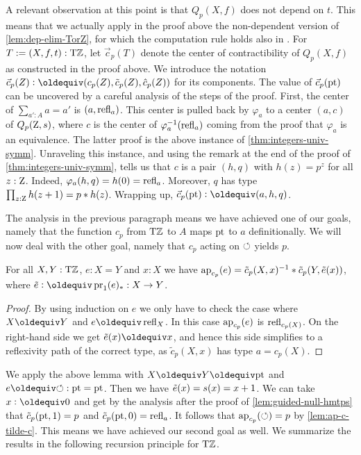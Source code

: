 \documentclass[a4paper,12pt]{amsart}
\begin{document}
A relevant observation at this point is that $Q_p(X,f)$ does not depend on $t$.
This means that we actually apply in the proof above the non-dependent version
of \cref{lem:dep-elim-TorZ}, for which the computation rule holds also in {\UniMath}.
For $T := (X,f,t) : {\mathrm{T}\mathbb{Z}}$, let $\vec{c}_p(T)$ denote the center of contractibility
of $Q_p(X,f)$ as constructed in the proof above.
  We introduce the notation $\vec{c}_p(Z)\defeq(c_p(Z),\tilde{c}_p(Z),\hat{c}_p(Z))$ for its components.
  The value of $\vec{c}_p({\mathord{\mathrm{pt}}})$ can be uncovered by a careful analysis of the steps of the proof.
First, the center of $\sum_{a':A} a=a'$ is $(a,\mathop{{\mathrm{refl}}_{a}})$.
This center is pulled back by $\varphi_{a}$ to a center
$(a,c)$ of $Q_p(\mathrm{Z},s)$, where $c$ is the center of
$\varphi_{a}^{-1}(\mathop{{\mathrm{refl}}_{a}})$ coming from the proof
that $\varphi_{a}$ is an equivalence. The latter proof
is the above instance of \cref{thm:integers-univ-symm}.
Unraveling this instance, and using the remark at the
end of the proof of \cref{thm:integers-univ-symm},
tells us that $c$ is a pair $(h,q)$ with $h(z)=p^z$
for all $z:\mathrm{Z}$. Indeed, $\varphi_{a}(h,q) = h(0) = \mathop{{\mathrm{refl}}_{a}}$.
Moreover, $q$ has type $\prod_{z:\mathrm{Z}} h(z+1)=p* h(z)$.
Wrapping up, $\vec c_p(\pt)\defeq (a,h,q)$.

The analysis in the previous paragraph
means we have achieved one of our goals,
namely that the function $c_p$ from ${\mathrm{T}\mathbb{Z}}$ to $A$
maps ${\mathord{\mathrm{pt}}}$ to $a$ definitionally.
We will now deal with the other goal,
namely that $c_p$ acting on ${\circlearrowleft}$ yields $p$.

\begin{lemma}\label{lem:ap-c-tilde-c}
For all $X,Y:{\mathrm{T}\mathbb{Z}}$, $e: X=Y$ and $x:X$ we have
$\mathop{{\mathrm{ap}}_{c_p}}(e) = \tilde c_p(X,x)^{-1}* \tilde c_p(Y,\tilde {e}(x))$,
where $\ptoe{e}\defeq \pr_1(e)_* : X\to Y$.
\end{lemma}
\begin{proof}
By using induction on $e$ we only have to check the case where
$X\jdeq Y$ and $e\jdeq\refl{X}$. In this case $\mathop{{\mathrm{ap}}_{c_p}}(e)$ is
$\mathop{{\mathrm{refl}}_{c_p(X)}}$. On the right-hand side we get $\ptoe{e}(x)\jdeq x$,
and hence this side simplifies to a reflexivity path of
the correct type, as $\tilde c_p(X,x)$ has type $a=c_p(X)$.
\end{proof}

We apply the above lemma with $X\jdeq Y\jdeq \pt$ and $e\jdeq{\Zloop}: \pt=\pt$.
Then we have $\tilde {e}(x)=s(x)=x+1$. We can take $x\defeq 0$ and get by
the analysis after the proof of \cref{lem:guided-null-hmtps}
that $\tilde c_p({\mathord{\mathrm{pt}}},1) = p$ and $\tilde c_p({\mathord{\mathrm{pt}}},0) = \mathop{{\mathrm{refl}}_{a}}$.
It follows that $\mathop{{\mathrm{ap}}_{c_p}}({\circlearrowleft}) = p$ by \cref{lem:ap-c-tilde-c}.
This means we have achieved our second goal as well.
We summarize the results in the following recursion principle for ${\mathrm{T}\mathbb{Z}}$.
\end{document}
